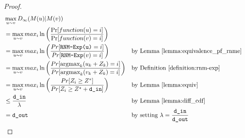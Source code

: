 \documentclass{article} %
\begin{document}
 \begin{proof}
\begin{align}
    & \max_{u \sim v} D_\infty(M(u) | M(v)) \\
    & = \max_{u \sim v} max_i \ln\left(\frac{\Pr[function(u) = i]}{\Pr[function(v) = i]}\right) && \\
    & = \max_{u \sim v} max_i \ln\left(\frac{ Pr[\texttt{RNM-Exp(u)} = i]}{Pr[\texttt{RNM-Exp}(v) = i]} \right) &&  \text{by Lemma \ref{lemma:equivalence_pf_rnme}}\\
    & = \max_{u \sim v} max_i \ln\left(\frac{Pr[\text{argmax}_k(u_k + Z_k) = i]}{Pr[\text{argmax}_k(v_k + Z_k) = i]}\right) && \text{by Definition \ref{definition:rnm-exp}}  \\
    & = \max_{u \sim v} max_i \ln\left(\frac{Pr[Z_i \geq  Z^*]}{Pr[Z_i \geq  Z^* + \texttt{d\_in}]}\right) && \text{by Lemma \ref{lemma:equiv}}\\
    & \le \frac{\texttt{d\_in}}{\lambda} && \text{by Lemma \ref{lemma:diff_cdf}} \\
    & = \texttt{d\_out} && \text{by setting $\lambda = \frac{\texttt{d\_in}}{\texttt{d\_out}}$}
\end{align}
\end{proof}
\label{sec:python-rnme-pseudocode}




\end{document}
